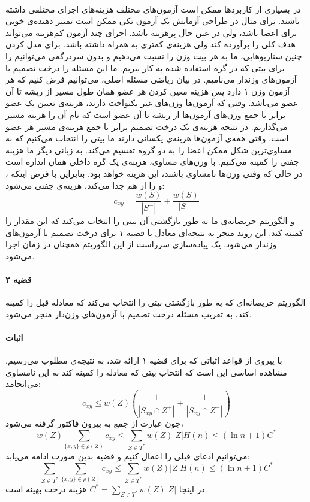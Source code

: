 \documentclass[a4paper]{article}
\begin{document}
	\paragraph{}
	در بسیاری از کاربردها ممکن است آزمون‌های مختلف هزینه‌های اجرای مختلفی داشته باشند. برای مثال در طراحی آزمایش
	یک آزمون تکی ممکن است تمییز دهنده‌ی خوبی برای اعضا باشد، ولی در عین حال پرهزینه باشد. اجرای چند آزمون کم‌هزینه
	می‌تواند هدف کلی را برآورده کند ولی هزینه‌ی کمتری به همراه داشته باشد. برای مدل کردن چنین سناریوهایی، ما به هر 
	بیت
	وزن
	را نسبت می‌دهیم و بدون سردرگمی می‌توانیم 
	را برای بیتی که در گره
	استفاده شده به کار ببریم.
	ما این مسئله را درخت تصمیم با آزمون‌های وزندار می‌نامیم. در بیان ریاضی مسئله اصلی، می‌توانیم فرض کنیم که هر آزمون وزن ۱ دارد پس هزینه معین کردن هر عضو همان طول مسیر از ریشه تا آن عضو می‌باشد. وقتی که آزمون‌ها وزن‌های غیر یکنواخت دارند، هزینه‌ی تعیین یک عضو برابر با جمع وزن‌های آزمون‌ها از ریشه تا آن عضو است که نام آن را هزینه مسیر می‌گذاریم. در نتیجه هزینه‌ی یک درخت تصمیم برابر با جمع هزینه‌ی مسیر هر عضو است. وقتی همه‌ی آزمون‌ها هزینه‌ي یکسانی دارند ما بیتی را انتخاب می‌کنیم که به مساوی‌ترین شکل ممکن اعضا را به دو گروه تفسیم می‌کند. به زبانی دیگر ما هزینه جفتی 
	را کمینه می‌کنیم. با وزن‌های مساوی، هزینه‌ی یک گره داخلی همان اندازه
	است در حالی که وقتی وزن‌ها نامساوی باشند، این هزینه
	خواهد بود. بنابراین با فرض اینکه 
	،
	و
	را از هم جدا می‌کند، هزینه‌ي جفتی می‌شود:
	\[c_{xy} = \frac{w(S)}{|S^+|} + \frac{w(S)}{|S^-|}\]
	و الگوریتم حریصانه‌ی ما به طور بازگشتی آن بیتی را انتخاب می‌کند که این مقدار را کمینه کند. این روند منجر به
	نتیجه‌ای معادل با قضیه ۱ برای درخت تصمیم با آزمون‌های وزندار می‌شود. یک پیاده‌سازی سرراست از این الگوریتم همچنان
	در زمان
	اجرا می‌شود.  
	\paragraph{قضیه ۲}
	الگوریتم حریصانه‌ای که به طور بازگشتی بیتی را انتخاب می‌کند که معادله قبل را کمینه کند، به تقریب 
	مسئله درخت تصمیم با آزمون‌های وزن‌دار منجر می‌شود.
	\paragraph{اثبات}
	با پیروی از قواعد اثباتی که برای قضیه ۱ ارائه شد، به نتیجه‌ی مطلوب می‌رسیم. مشاهده اساسی این است که انتخاب
	بیتی که معادله را کمینه کند به این نامساوی می‌انجامد:
	\[c_{xy} \le w(Z) (\frac{1}{|S_{xy} \cap Z^+|} + \frac{1}{|S_{xy} \cap Z^-|})\]
	جون عبارت
	از جمع به بیرون فاکتور گرفته می‌شود،
	\[w(Z) \sum_{\{x,y\}\in \rho(Z)} c_{xy} \le \sum_{Z \in T^*} w(Z)|Z| H(n) \le (\ln n + 1)C^* \]
	می‌توانیم ادعای قبلی را اعمال کنیم و قضیه بدین صورت ادامه می‌یابد:
	\[\sum_{Z \in T^*} \sum_{\{x,y\}\in \rho(Z)} c_{xy} \le \sum_{Z \in T^*} w(Z)|Z|H(n) \le (\ln n + 1)C^*\]
	در اینجا 
	$C^* = \sum_{Z \in T^*} w(Z)|Z|$
	هزینه درخت بهینه است.
\end{document}

